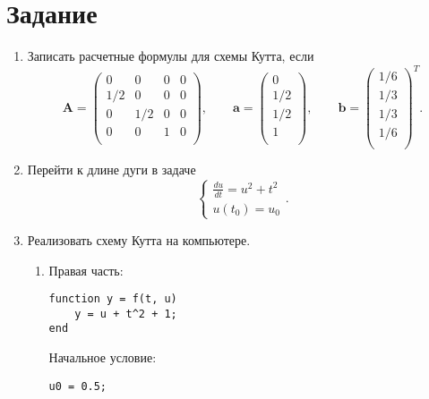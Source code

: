 \section{Задание}
\begin{enumerate}
\item Записать расчетные формулы для схемы Кутта, если
\begin{equation} \nonumber
	\mathbf{A} = 
		\begin{pmatrix}
		0 & 0 & 0 & 0 \\
		1/2 & 0 & 0 & 0 \\
		0 & 1/2 & 0 & 0 \\
		0 & 0 & 1 & 0 \\
		\end{pmatrix},
	\qquad
	\mathbf{a} = 
		\begin{pmatrix}
		0 \\
		1/2 \\
		1/2 \\
		1 \\
		\end{pmatrix},
	\qquad
	\mathbf{b} = 
		\begin{pmatrix}
		1/6 \\
		1/3 \\
		1/3 \\
		1/6 \\
		\end{pmatrix}^T.
\end{equation}
\item Перейти к длине дуги в задаче
\begin{equation} \nonumber
	\begin{cases}
		\displaystyle \frac{du}{dt} = u^2 + t^2 \\
		u(t_0) = u_0
	\end{cases}.
\end{equation}
\item Реализовать схему Кутта на компьютере.
\begin{enumerate}
\item Правая часть: 
\begin{matlablisting}
	\begin{lstlisting}
function y = f(t, u)
    y = u + t^2 + 1;
end
	\end{lstlisting}
\end{matlablisting}
Начальное условие:
\begin{matlablisting}
	\begin{lstlisting}
u0 = 0.5;
	\end{lstlisting}
\end{matlablisting}

\end{enumerate}
\end{enumerate}

